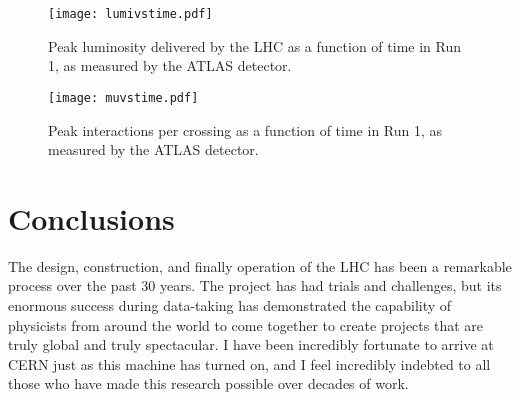 \begin{figure}
\centering
\texttt{[image: lumivstime.pdf]}
\label{fig:lhc:lumivstime}
\caption{Peak luminosity delivered by the LHC as a function of time in Run 1, as measured by the ATLAS detector.}
\end{figure}




\begin{figure}
\centering
\texttt{[image: muvstime.pdf]}
\label{fig:lhc:muvstime}
\caption{Peak interactions per crossing as a function of time in Run 1, as measured by the ATLAS detector.}
\end{figure}


\section{Conclusions}

The design, construction, and finally operation of the LHC has been a remarkable process over the past 30 years. The project has had trials and challenges, but its enormous success during data-taking has demonstrated the capability of physicists from around the world to come together to create projects that are truly global and truly spectacular. I have been incredibly fortunate to arrive at CERN just as this machine has turned on, and I feel incredibly indebted to all those who have made this research possible over decades of work.


